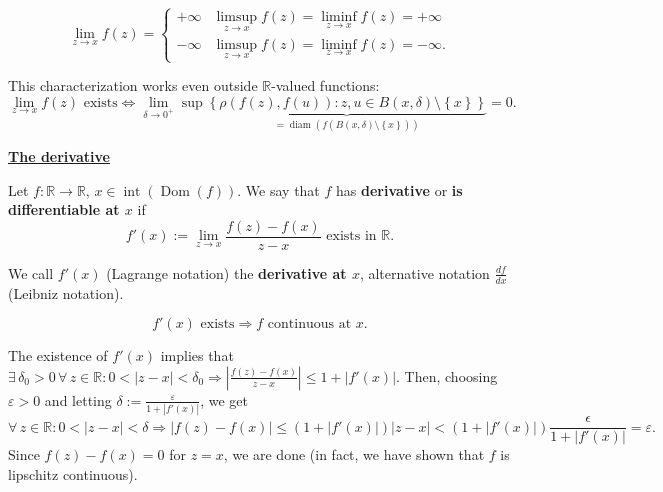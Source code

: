 \documentclass{notes}
\begin{document}
\begin{defn}
  \[
    \lim_{z \to x} f(z) = \begin{cases}
      +\infty & \limsup_{z \to x} f(z) = \liminf_{z \to x} f(z) = +\infty \\
      -\infty & \limsup_{z \to x} f(z) = \liminf_{z \to x} f(z) = -\infty.
    \end{cases}
  \]
\end{defn}

\begin{note}
  This characterization works even outside $\mathbb R$-valued functions:
  \[
    \lim_{z \to x} f(z) \text{ exists} \Leftrightarrow \lim_{\delta \to 0^+} \sup \underbrace{\left \{ \rho(f(z), f(u)) : z, u \in B(x, \delta) \setminus \left \{ x \right \} \right \}}_{= \operatorname{diam}(f(B(x, \delta) \setminus \left \{ x \right \}))} = 0.
  \]
\end{note}

\underline{\boldmath \bfseries The derivative}

\begin{defn}
  Let $f \colon \mathbb R \to \mathbb R$, $x \in \operatorname{int} (\operatorname{Dom}(f))$.
  We say that $f$ has {\boldmath \bfseries derivative} or {\boldmath \bfseries is differentiable at $x$} if 
  \[
    f'(x) := \lim_{z \to x} \frac{f(z) - f(x)}{z - x} \text{ exists in $\mathbb R$}.
  \]
  
  We call $f'(x)$ (Lagrange notation) the {\boldmath \bfseries derivative at $x$}, alternative notation $\frac{df}{dx}$ (Leibniz notation).
\end{defn}

\begin{lem}
  \[
    f'(x) \text{ exists} \Rightarrow \text{$f$ continuous at $x$}.
  \]
\end{lem}

\begin{prf}
  The existence of $f'(x)$ implies that $\exists \, \delta_0 > 0 \, \forall \, z \in \mathbb R: 0 < \left | z - x \right | < \delta_0 \Rightarrow \left | \frac{f(z) - f(x)}{z - x} \right | \leq 1 + \left | f'(x) \right |$.
  Then, choosing $\varepsilon > 0$ and letting $\delta := \frac{\varepsilon}{1 + \left | f'(x) \right |}$, we get 
  \[
    \forall \, z \in \mathbb R: 0 < \left | z - x \right | < \delta \mathbb \Rightarrow \left | f(z) - f(x) \right | \leq (1 + \left | f'(x) \right |) \left | z - x \right | < (1 + \left | f'(x) \right |) \frac{\epsilon}{1 + \left | f'(x) \right |} = \varepsilon.
  \]
  Since $f(z) - f(x) = 0$ for $z = x$, we are done (in fact, we have shown that $f$ is lipschitz continuous).
\end{prf}
\end{document}
